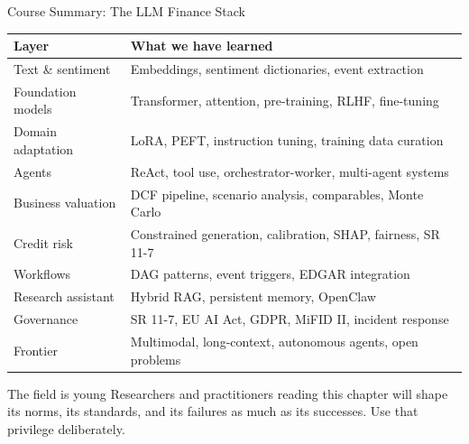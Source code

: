 \documentclass[9pt,t]{beamer}
\begin{document}
\begin{frame}[noframenumbering]{Course Summary: The LLM Finance Stack}

\begin{center}
\small
\begin{tabular}{ll}
\toprule
\textbf{Layer} & \textbf{What we have learned} \\
\midrule
Text \& sentiment & Embeddings, sentiment dictionaries, event extraction \\
Foundation models & Transformer, attention, pre-training, RLHF, fine-tuning \\
Domain adaptation & LoRA, PEFT, instruction tuning, training data curation \\
Agents & ReAct, tool use, orchestrator-worker, multi-agent systems \\
Business valuation & DCF pipeline, scenario analysis, comparables, Monte Carlo \\
Credit risk & Constrained generation, calibration, SHAP, fairness, SR 11-7 \\
Workflows & DAG patterns, event triggers, EDGAR integration \\
Research assistant & Hybrid RAG, persistent memory, OpenClaw \\
Governance & SR 11-7, EU AI Act, GDPR, MiFID II, incident response \\
Frontier & Multimodal, long-context, autonomous agents, open problems \\
\bottomrule
\end{tabular}
\end{center}

\medskip
\begin{block}{The field is young}
  Researchers and practitioners reading this chapter will shape its norms,
  its standards, and its failures as much as its successes. Use that privilege deliberately.
\end{block}
\end{frame}
\end{document}
